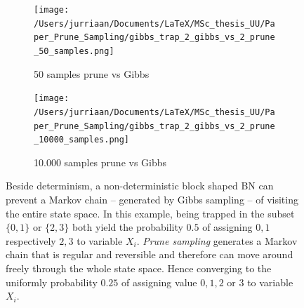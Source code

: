 \documentclass[a4paper, twoside, 11pt]{report}
\theoremstyle{plain}
\theoremstyle{definition}
\theoremstyle{remark}
\begin{document}
\begin{figure}[h!]
\centering
\begin{subfigure}{.49\textwidth}
  \centering
  \texttt{[image: /Users/jurriaan/Documents/LaTeX/MSc\_thesis\_UU/Paper\_Prune\_Sampling/gibbs\_trap\_2\_gibbs\_vs\_2\_prune\_50\_samples.png]}
  \caption{50 samples prune vs Gibbs}
  \label{fig:sub1}
\end{subfigure}
\begin{subfigure}{.49\textwidth}
  \centering
  \texttt{[image: /Users/jurriaan/Documents/LaTeX/MSc\_thesis\_UU/Paper\_Prune\_Sampling/gibbs\_trap\_2\_gibbs\_vs\_2\_prune\_10000\_samples.png]}
  \caption{10.000 samples prune vs Gibbs}
  \label{fig:sub2}
\end{subfigure}
\vspace{0.75pc}
\caption{Beside determinism, a non-deterministic block shaped BN can prevent a Markov chain -- generated by Gibbs sampling -- of visiting the entire state space. In this example, being trapped in the subset $\{0, 1\}$ or $\{2, 3\}$ both yield the probability $0.5$ of assigning $0,1$ respectively $2,3$ to variable $X_i$. \textit{Prune sampling} generates a Markov chain that is regular and reversible and therefore can move around freely through the whole state space. Hence converging to the uniformly probability $0.25$ of assigning value $0,1,2$ or $3$ to variable $X_i$.} 
\label{block-BN}
\end{figure}
\end{document}
